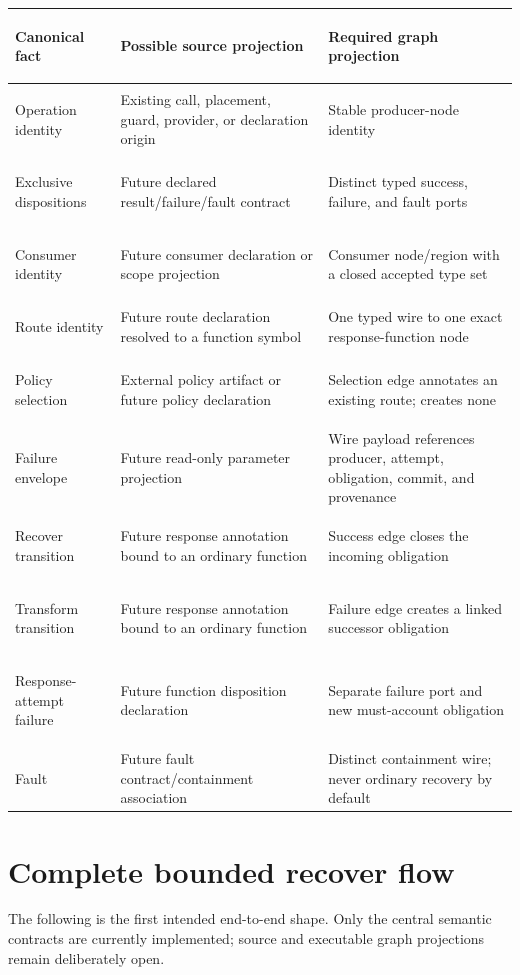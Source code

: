 \documentclass[11pt,a4paper]{article}
\begin{document}
\small
\begin{tabularx}{\linewidth}{>{\bfseries\raggedright\arraybackslash}p{31mm}
  >{\raggedright\arraybackslash}X
  >{\raggedright\arraybackslash}X}
\toprule
Canonical fact & Possible source projection & Required graph projection \\
\midrule
Operation identity & Existing call, placement, guard, provider, or declaration origin & Stable producer-node identity \\
Exclusive dispositions & Future declared result/failure/fault contract & Distinct typed success, failure, and fault ports \\
Consumer identity & Future consumer declaration or scope projection & Consumer node/region with a closed accepted type set \\
Route identity & Future route declaration resolved to a function symbol & One typed wire to one exact response-function node \\
Policy selection & External policy artifact or future policy declaration & Selection edge annotates an existing route; creates none \\
Failure envelope & Future read-only parameter projection & Wire payload references producer, attempt, obligation, commit, and provenance \\
Recover transition & Future response annotation bound to an ordinary function & Success edge closes the incoming obligation \\
Transform transition & Future response annotation bound to an ordinary function & Failure edge creates a linked successor obligation \\
Response-attempt failure & Future function disposition declaration & Separate failure port and new must-account obligation \\
Fault & Future fault contract/containment association & Distinct containment wire; never ordinary recovery by default \\
\bottomrule
\end{tabularx}
\normalsize

\section{Complete bounded recover flow}

The following is the first intended end-to-end shape. Only the central semantic
contracts are currently implemented; source and executable graph projections
remain deliberately open.
\end{document}
